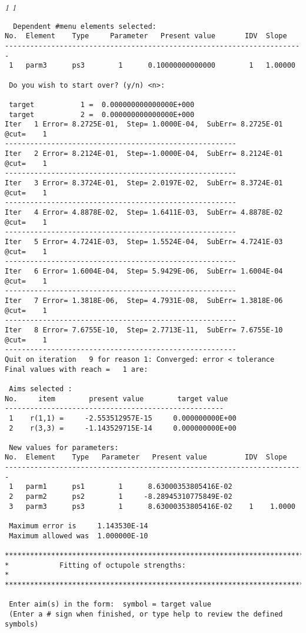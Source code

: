 {\em 1 1}

\begin{footnotesize}
\begin{verbatim}
  Dependent #menu elements selected:
No.  Element    Type     Parameter   Present value       IDV  Slope
-----------------------------------------------------------------------
 1   parm3      ps3        1      0.10000000000000        1   1.00000

 Do you wish to start over? (y/n) <n>:

 target           1 =  0.000000000000000E+000
 target           2 =  0.000000000000000E+000
Iter   1 Error= 8.2725E-01,  Step= 1.0000E-04,  SubErr= 8.2725E-01 @cut=    1
-------------------------------------------------------
Iter   2 Error= 8.2124E-01,  Step=-1.0000E-04,  SubErr= 8.2124E-01 @cut=    1
-------------------------------------------------------
Iter   3 Error= 8.3724E-01,  Step= 2.0197E-02,  SubErr= 8.3724E-01 @cut=    1
-------------------------------------------------------
Iter   4 Error= 4.8878E-02,  Step= 1.6411E-03,  SubErr= 4.8878E-02 @cut=    1
-------------------------------------------------------
Iter   5 Error= 4.7241E-03,  Step= 1.5524E-04,  SubErr= 4.7241E-03 @cut=    1
-------------------------------------------------------
Iter   6 Error= 1.6004E-04,  Step= 5.9429E-06,  SubErr= 1.6004E-04 @cut=    1
-------------------------------------------------------
Iter   7 Error= 1.3818E-06,  Step= 4.7931E-08,  SubErr= 1.3818E-06 @cut=    1
-------------------------------------------------------
Iter   8 Error= 7.6755E-10,  Step= 2.7713E-11,  SubErr= 7.6755E-10 @cut=    1
-------------------------------------------------------
Quit on iteration   9 for reason 1: Converged: error < tolerance
Final values with reach =   1 are:

 Aims selected :
No.     item        present value        target value
----------------------------------------------------
 1    r(1,1) =     -2.553512957E-15     0.000000000E+00
 2    r(3,3) =     -1.143529715E-14     0.000000000E+00

 New values for parameters:
No.  Element    Type   Parameter   Present value         IDV  Slope
-----------------------------------------------------------------------
 1   parm1      ps1        1      8.63000353805416E-02
 2   parm2      ps2        1     -8.28945310775849E-02
 3   parm3      ps3        1      8.63000353805416E-02    1    1.0000

 Maximum error is     1.143530E-14
 Maximum allowed was  1.000000E-10

***************************************************************************
*            Fitting of octupole strengths:                               *
***************************************************************************

 Enter aim(s) in the form:  symbol = target value
 (Enter a # sign when finished, or type help to review the defined symbols)
\end{verbatim}
\end{footnotesize}
